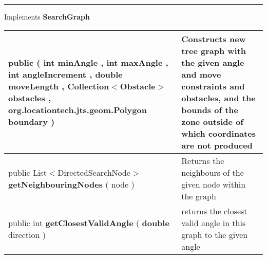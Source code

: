 {\vspace*{4pt} \hrule \vspace*{3pt}
Implements \textbf{ SearchGraph }
\vspace*{-5pt} 
\begin{tabularx}{\linewidth}{m{}|m{}}
\label{tab:ConstrainedTreeGraph}
\begin{raggedleft}public  \textbf{\hyperref[tab:ConstrainedTreeGraph]{\color{blue}{ConstrainedTreeGraph}} }(\newline \hfill 
\hspace*{ 5pt} \textbf{int} minAngle , \newline
 \hspace*{ 5pt} \textbf{int} maxAngle , \newline
 \hspace*{ 5pt} \textbf{int} angleIncrement , \newline
 \hspace*{ 5pt} \textbf{double} moveLength , \newline
 \hspace*{ 5pt} \textbf{Collection$<$Obstacle$>$} obstacles , \newline
 \hspace*{ 5pt} \textbf{org.locationtech.jts.geom.Polygon} boundary  )
\end{raggedleft} &
 Constructs new tree graph with the given angle and move constraints and obstacles, and the bounds of the zone outside of which coordinates are not produced\\ \hline 
\begin{raggedleft}public List$<$DirectedSearchNode$>$ \textbf{getNeighbouringNodes }(\hspace*{ 5pt} \textbf{\hyperref[tab:DirectedSearchNode]{\color{blue}{DirectedSearchNode}}} node  )
\end{raggedleft} &
 Returns the neighbours of the given node within the graph\\ \hline 
\begin{raggedleft}public int \textbf{getClosestValidAngle }(\hspace*{ 5pt} \textbf{double} direction  )
\end{raggedleft} &
 returns the closest valid angle in this graph to the given angle\\\end{tabularx}
}
